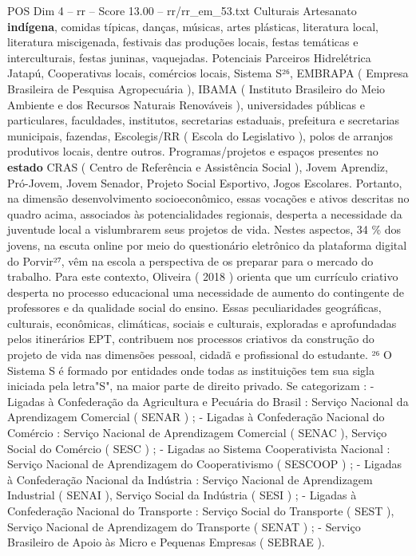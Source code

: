 \begin{textsample}{POS Dim 4 – rr – Score 13.00 – rr/rr\_em\_53.txt}
Culturais Artesanato \textbf{indígena}, comidas típicas, danças, músicas, artes plásticas, literatura local, literatura miscigenada, festivais das produções locais, festas temáticas e interculturais, festas juninas, vaquejadas.
Potenciais Parceiros Hidrelétrica Jatapú, Cooperativas locais, comércios locais, Sistema S²⁶, EMBRAPA ( Empresa Brasileira de Pesquisa Agropecuária ), IBAMA ( Instituto Brasileiro do Meio Ambiente e dos Recursos Naturais Renováveis ), universidades públicas e particulares, faculdades, institutos, secretarias estaduais, prefeitura e secretarias municipais, fazendas, Escolegis/RR ( Escola do Legislativo ), polos de arranjos produtivos locais, dentre outros.
Programas/projetos e espaços presentes no \textbf{estado} CRAS ( Centro de Referência e Assistência Social ), Jovem Aprendiz, Pró-Jovem, Jovem Senador, Projeto Social Esportivo, Jogos Escolares.
Portanto, na dimensão desenvolvimento socioeconômico, essas vocações e ativos descritas no quadro acima, associados às potencialidades regionais, desperta a necessidade da juventude local a vislumbrarem seus projetos de vida.
Nestes aspectos, 34 \% dos jovens, na escuta online por meio do questionário eletrônico da plataforma digital do Porvir²⁷, vêm na escola a perspectiva de os preparar para o mercado do trabalho.
Para este contexto, Oliveira ( 2018 ) orienta que um currículo criativo desperta no processo educacional uma necessidade de aumento do contingente de professores e da qualidade social do ensino.
Essas peculiaridades geográficas, culturais, econômicas, climáticas, sociais e culturais, exploradas e aprofundadas pelos itinerários EPT, contribuem nos processos criativos da construção do projeto de vida nas dimensões pessoal, cidadã e profissional do estudante. ²⁶ O Sistema S é formado por entidades onde todas as instituições tem sua sigla iniciada pela letra"S", na maior parte de direito privado.
Se categorizam : - Ligadas à Confederação da Agricultura e Pecuária do Brasil : Serviço Nacional da Aprendizagem Comercial ( SENAR ) ; - Ligadas à Confederação Nacional do Comércio : Serviço Nacional de Aprendizagem Comercial ( SENAC ), Serviço Social do Comércio ( SESC ) ; - Ligadas ao Sistema Cooperativista Nacional : Serviço Nacional de Aprendizagem do Cooperativismo ( SESCOOP ) ; - Ligadas à Confederação Nacional da Indústria : Serviço Nacional de Aprendizagem Industrial ( SENAI ), Serviço Social da Indústria ( SESI ) ; - Ligadas à Confederação Nacional do Transporte : Serviço Social do Transporte ( SEST ), Serviço Nacional de Aprendizagem do Transporte ( SENAT ) ; - Serviço Brasileiro de Apoio às Micro e Pequenas Empresas ( SEBRAE ).

\end{textsample}
